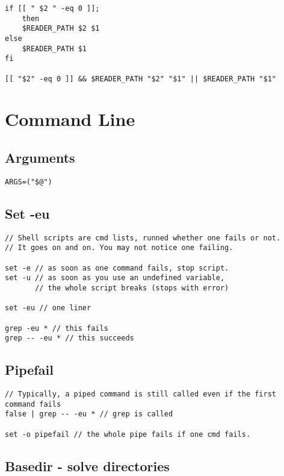 \begin{verbatim}
if [[ " $2 " -eq 0 ]];
    then
    $READER_PATH $2 $1
else
    $READER_PATH $1
fi

[[ "$2" -eq 0 ]] && $READER_PATH "$2" "$1" || $READER_PATH "$1"
\end{verbatim}

\section{Command Line}

\subsection{Arguments}

\begin{verbatim}
ARGS=("$@")
\end{verbatim}

\subsection{Set -eu}

\begin{verbatim}
// Shell scripts are cmd lists, runned whether one fails or not.
// It goes on and on. You may not notice one failing. 

set -e // as soon as one command fails, stop script. 
set -u // as soon as you use an undefined variable, 
       // the whole script breaks (stops with error)

set -eu // one liner

grep -eu * // this fails
grep -- -eu * // this succeeds
\end{verbatim}

\subsection{Pipefail}

\begin{verbatim}
// Typically, a piped command is still called even if the first command fails
false | grep -- -eu * // grep is called

set -o pipefail // the whole pipe fails if one cmd fails. 
\end{verbatim}

\subsection{Basedir - solve directories}

